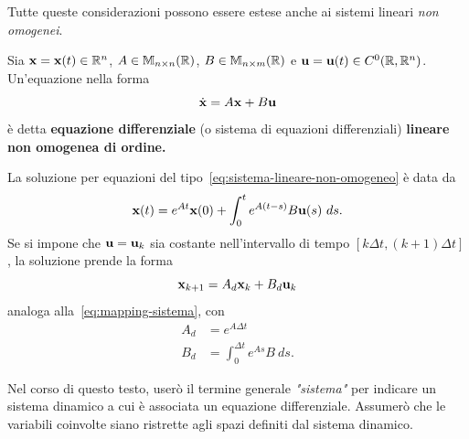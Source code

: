 Tutte queste considerazioni possono essere estese anche ai sistemi lineari
\emph{non omogenei}.


\begin{definition}
    Sia $\mathbf{x} = \mathbf{x}(t) \in \mathbb{R}^n$, $A \in \mathbb{M}_{n\times n}(\mathbb{R})$, $B \in \mathbb{M}_{n\times m}(\mathbb{R})$ e $\mathbf{u} = \mathbf{u}(t) \in C^0(\mathbb{R}, \mathbb{R}^n)$.
    Un'equazione nella forma
    \begin{equation}
        \dot{\mathbf{x}} = A \mathbf{x} + B \mathbf{u}
        \label{eq:sistema-lineare-non-omogeneo}
    \end{equation}
    è detta \textbf{equazione differenziale} (o sistema di equazioni differenziali) \textbf{lineare non omogenea di  ordine.}
    \label{def:sistema-lineare-non-omogeneo}
\end{definition}

La soluzione per equazioni del tipo~\eqref{eq:sistema-lineare-non-omogeneo} è data da
\begin{equation}
    \mathbf{x}(t) = e^{At} \mathbf{x}(0) + \int_{0}^{t} e^{A(t-s)} B \mathbf{u}(s) \ ds.
    \label{eq:soluzione-lineare-non-omogeneo}
\end{equation}
Se si impone che $\mathbf{u} = \mathbf{u}_k$ sia costante nell'intervallo di tempo $[k \Delta t, (k + 1)\Delta t]$,
la soluzione prende la forma
\begin{equation*}
    \mathbf{x}_{k+1} = A_d \mathbf{x}_k + B_d \mathbf{u}_k
\end{equation*}
analoga alla~\eqref{eq:mapping-sistema}, con
\begin{align*}
    A_d &= e^{A\Delta t} \\
    B_d &= \int_0^{\Delta t}e^{As} B\ ds.
\end{align*}

Nel corso di questo testo, userò il termine generale \emph{"sistema"} per indicare
un sistema dinamico a cui è associata un equazione differenziale. Assumerò che le variabili
coinvolte siano ristrette agli spazi definiti dal sistema dinamico.


